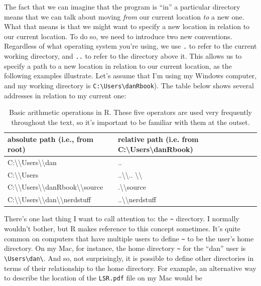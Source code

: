 \documentclass[
]{book}
\begin{document}
The fact that we can imagine that the program is ``in'' a particular directory means that we can talk about moving \emph{from} our current location \emph{to} a new one. What that means is that we might want to specify a new location in relation to our current location. To do so, we need to introduce two new conventions. Regardless of what operating system you're using, we use \texttt{.} to refer to the current working directory, and \texttt{..} to refer to the directory above it. This allows us to specify a path to a new location in relation to our current location, as the following examples illustrate. Let's assume that I'm using my Windows computer, and my working directory is \texttt{C:\textbackslash{}Users\textbackslash{}danRbook}). The table below shows several addresses in relation to my current one:

\begin{table}

\caption{\label{tab:unnamed-chunk-109}Basic arithmetic operations in R. These five operators are used very frequently throughout the text, so it's important to be familiar with them at the outset.}
\centering
\begin{tabular}[t]{ll}
\toprule
absolute path (i.e., from root) & relative path (i.e. from C:\textbackslash{}Users\textbackslash{}danRbook)\\
\midrule
C:\textbackslash{}\textbackslash{}Users\textbackslash{}\textbackslash{}dan & ..\\
C:\textbackslash{}\textbackslash{}Users & ..\textbackslash{}\textbackslash{}.. \textbackslash{}\textbackslash{}\\
C:\textbackslash{}\textbackslash{}Users\textbackslash{}\textbackslash{}danRbook\textbackslash{}\textbackslash{}source & .\textbackslash{}\textbackslash{}source\\
C:\textbackslash{}\textbackslash{}Users\textbackslash{}\textbackslash{}dan\textbackslash{}\textbackslash{}nerdstuff & ..\textbackslash{}\textbackslash{}nerdstuff\\
\bottomrule
\end{tabular}
\end{table}

There's one last thing I want to call attention to: the \texttt{\textasciitilde{}} directory. I normally wouldn't bother, but R makes reference to this concept sometimes. It's quite common on computers that have multiple users to define \texttt{\textasciitilde{}} to be the user's home directory. On my Mac, for instance, the home directory \texttt{\textasciitilde{}} for the ``dan'' user is \texttt{\textbackslash{}Users\textbackslash{}dan\textbackslash{}}. And so, not surprisingly, it is possible to define other directories in terms of their relationship to the home directory. For example, an alternative way to describe the location of the \texttt{LSR.pdf} file on my Mac would be
\end{document}
